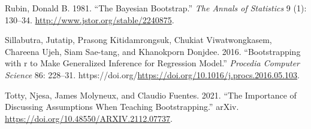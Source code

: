 \documentclass[
  letterpaper,
  DIV=11,
  numbers=noendperiod]{scrartcl}
\newlength{\cslhangindent}
\newlength{\cslentryspacingunit} %
\newenvironment{CSLReferences}[2] %
 {%
  \setlength{\parindent}{0pt}
  \ifodd #1
  \let\oldpar\par
  \def\par{\hangindent=\cslhangindent\oldpar}
  \fi
  \setlength{\parskip}{#2\cslentryspacingunit}
 }%
 {}
\begin{document}
\begin{CSLReferences}{1}{0}
\leavevmode{}%
Rubin, Donald B. 1981. {``The Bayesian Bootstrap.''} \emph{The Annals of
Statistics} 9 (1): 130--34. \url{http://www.jstor.org/stable/2240875}.

\leavevmode{}%
Sillabutra, Jutatip, Prasong Kitidamrongsuk, Chukiat Viwatwongkasem,
Chareena Ujeh, Siam Sae-tang, and Khanokporn Donjdee. 2016.
{``Bootstrapping with r to Make Generalized Inference for Regression
Model.''} \emph{Procedia Computer Science} 86: 228--31.
https://doi.org/\url{https://doi.org/10.1016/j.procs.2016.05.103}.

\leavevmode{}%
Totty, Njesa, James Molyneux, and Claudio Fuentes. 2021. {``The
Importance of Discussing Assumptions When Teaching Bootstrapping.''}
arXiv. \url{https://doi.org/10.48550/ARXIV.2112.07737}.

\end{CSLReferences}
\end{document}
